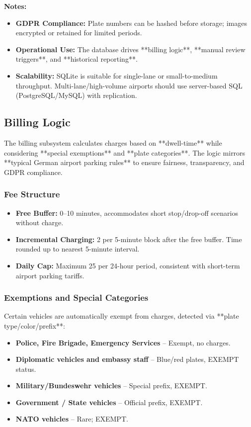 	\textbf{Notes:}
	\begin{itemize}
		\item \textbf{GDPR Compliance:} Plate numbers can be hashed before storage; images encrypted or retained for limited periods.
		\item \textbf{Operational Use:} The database drives **billing logic**, **manual review triggers**, and **historical reporting**.
		\item \textbf{Scalability:} SQLite is suitable for single-lane or small-to-medium throughput. Multi-lane/high-volume airports should use server-based SQL (PostgreSQL/MySQL) with replication.
	\end{itemize}
	
	\subsection{Billing Logic}
	The billing subsystem calculates charges based on **dwell-time** while considering **special exemptions** and **plate categories**. The logic mirrors **typical German airport parking rules** to ensure fairness, transparency, and GDPR compliance.
	
	\subsubsection{Fee Structure}
	\begin{itemize}
		\item \textbf{Free Buffer:} 0--10 minutes, accommodates short stop/drop-off scenarios without charge.
		\item \textbf{Incremental Charging:} \texteuro{}2 per 5-minute block after the free buffer. Time rounded up to nearest 5-minute interval.
		\item \textbf{Daily Cap:} Maximum \texteuro{}25 per 24-hour period, consistent with short-term airport parking tariffs.
	\end{itemize}
	
	\subsubsection{Exemptions and Special Categories}
	Certain vehicles are automatically exempt from charges, detected via **plate type/color/prefix**:
	\begin{itemize}
		\item \textbf{Police, Fire Brigade, Emergency Services} -- Exempt, no charges.
		\item \textbf{Diplomatic vehicles and embassy staff} -- Blue/red plates, EXEMPT status.
		\item \textbf{Military/Bundeswehr vehicles} -- Special prefix, EXEMPT.
		\item \textbf{Government / State vehicles} -- Official prefix, EXEMPT.
		\item \textbf{NATO vehicles} -- Rare; EXEMPT.
	\end{itemize}
	
